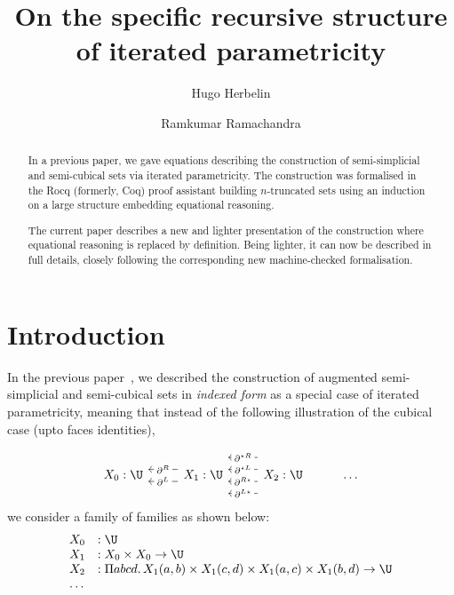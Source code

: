 \documentclass{msc}
\newcommand{\kstar}{{\star}}
\begin{document}
\title{On the specific recursive structure of iterated parametricity}
\begin{authgrp}
  \author{Hugo Herbelin}
  \author{Ramkumar Ramachandra}
\end{authgrp}
\begin{abstract}
  In a previous paper, we gave equations describing the construction of semi-simplicial and semi-cubical sets via iterated parametricity. The construction was formalised in the Rocq (formerly, Coq) proof assistant building $n$-truncated sets using an induction on a large structure embedding equational reasoning.

  The current paper describes a new and lighter presentation of the construction where equational reasoning is replaced by definition. Being lighter, it can now be described in full details, closely following the corresponding new machine-checked formalisation.
\end{abstract}
\maketitle
\vspace{-2em} %

\section{Introduction}
In the previous paper~\citep{hr25}, we described the construction of augmented semi-simplicial and semi-cubical sets in \emph{indexed form} as a special case of iterated parametricity, meaning that instead of the following illustration of the cubical case (upto faces identities),

\begin{equation*}
  \begin{tikzcd}
    X_0: \U & X_1: \U \arrow[l, "\partial^L" description, shift left=2] \arrow[l, "\partial^R" description, shift right=2] & X_2: \U \arrow[l, "\partial^{L\kstar}" description, shift left=6] \arrow[l, "\partial^{R\kstar}" description, shift left=2] \arrow[l, "\partial^{\kstar L}" description, shift right=2] \arrow[l, "\partial^{\kstar R}" description, shift right=6] & \ldots
  \end{tikzcd}
\end{equation*}
we consider a family of families as shown below:
\begin{equation*}
  \begin{array}{lll}
    X_0 & :               \U                                                                          \\
    X_1 & :               X_0 \times X_0 \rightarrow  \U                                              \\
    X_2 & : \Pi a b c d.\,  X_1(a,b) \times X_1 (c,d) \times X_1(a,c) \times X_1 (b,d) \rightarrow \U \\
    \ldots
  \end{array}
\end{equation*}
\end{document}
